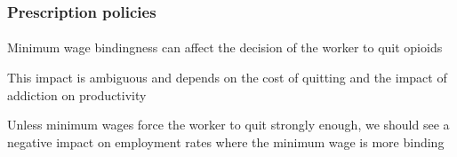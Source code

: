 \begin{frame}

    \frametitle{Prescription policies} %
    \framesubtitle{}  %
    \rmfamily %

    \begin{wideitemize}
        \item Minimum wage bindingness can affect the decision of the worker to quit opioids
        \item This impact is \textcolor{fblu}{ambiguous} and depends on the \textcolor{fblu}{cost of quitting} and the \textcolor{fblu}{impact of addiction on productivity}
        \item Unless minimum wages force the worker to quit strongly enough, we should see a \textcolor{fblu}{negative impact on employment rates} where the minimum wage is \textcolor{fblu}{more binding}
    \end{wideitemize}

\end{frame}

